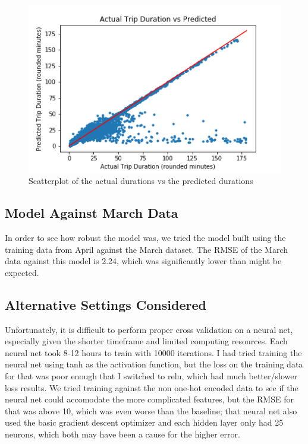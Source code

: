 \documentclass[conference]{IEEEtran}
\begin{document}
 \begin{figure}
  \centering
    \includegraphics[width=\linewidth]{actualVsPredicted.png}
      \caption{Scatterplot of the actual durations vs the predicted durations}
      \label{predAct}
\end{figure}

\subsection{Model Against March Data} \label{march}
In order to see how robust the model was, we tried the model built using the training data from April against the March dataset.  The RMSE of the March data against this model is 2.24, which was significantly lower than might be expected.

\subsection{Alternative Settings Considered}
Unfortunately, it is difficult to perform proper cross validation on a neural net, especially given the shorter timeframe and limited computing resources.  Each neural net took 8-12 hours to train with 10000 iterations.  I had tried training the neural net using tanh as the activation function, but the loss on the training data for that was poor enough that I switched to relu, which had much better/slower loss results.  We tried training against the non one-hot encoded data to see if the neural net could accomodate the more complicated features, but the RMSE for that was above 10, which was even worse than the baseline; that neural net also used the basic gradient descent optimizer and each hidden layer only had 25 neurons, which both may have been a cause for the higher error.
\end{document}
